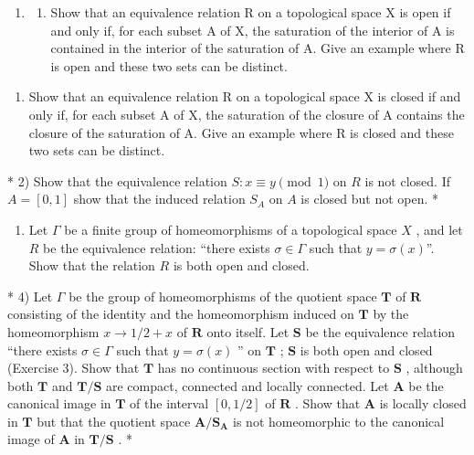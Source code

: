 \BourbakiExerciseGroup

\begin{enumerate}
\def\labelenumi{\arabic{enumi})}
\tightlist
\item
  \begin{enumerate}
  \def\labelenumii{\alph{enumii})}
  \tightlist
  \item
    Show that an equivalence relation R on a topological space X is open if and only if, for each subset A of X, the saturation of the interior of A is contained in the interior of the saturation of A. Give an example where R is open and these two sets can be distinct.
  \end{enumerate}
\end{enumerate}

\begin{enumerate}
\def\labelenumi{\alph{enumi})}
\setcounter{enumi}{1}
\tightlist
\item
  Show that an equivalence relation R on a topological space X is closed if and only if, for each subset A of X, the saturation of the closure of A contains the closure of the saturation of A. Give an example where R is closed and these two sets can be distinct.
\end{enumerate}

* 2) Show that the equivalence relation \(S: x \equiv y \pmod{1}\) on \(R\) is not closed. If \(A = [0,1]\) show that the induced relation \(S_A\) on \(A\) is closed but not open. *

\begin{enumerate}
\def\labelenumi{\arabic{enumi})}
\setcounter{enumi}{2}
\tightlist
\item
  Let \(\Gamma\) be a finite group of homeomorphisms of a topological space \(X\) , and let \(R\) be the equivalence relation: ``there exists \(\sigma \in \Gamma\) such that \(y = \sigma(x)\)''. Show that the relation \(R\) is both open and closed.
\end{enumerate}

* 4) Let \(\Gamma\) be the group of homeomorphisms of the quotient space \(\mathbf{T}\) of \(\mathbf{R}\) consisting of the identity and the homeomorphism induced on \(\mathbf{T}\) by the homeomorphism \(x \to 1/2 + x\) of \(\mathbf{R}\) onto itself. Let \(\mathbf{S}\) be the equivalence relation ``there exists \(\sigma \in \Gamma\) such that \(y = \sigma(x)\) '' on \(\mathbf{T}\) ; \(\mathbf{S}\) is both open and closed (Exercise 3). Show that \(\mathbf{T}\) has no continuous section with respect to \(\mathbf{S}\) , although both \(\mathbf{T}\) and \(\mathbf{T}/\mathbf{S}\) are compact, connected and locally connected. Let \(\mathbf{A}\) be the canonical image in \(\mathbf{T}\) of the interval \([0,1/2]\) of \(\mathbf{R}\) . Show that \(\mathbf{A}\) is locally closed in \(\mathbf{T}\) but that the quotient space \(\mathbf{A}/\mathbf{S}_{\mathbf{A}}\) is not homeomorphic to the canonical image of \(\mathbf{A}\) in \(\mathbf{T}/\mathbf{S}\) . *

